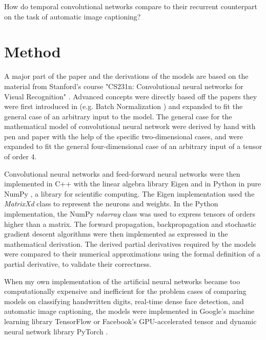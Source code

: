 \documentclass[a4paper, twoside]{article}
\begin{document}
How do temporal convolutional networks compare to their recurrent counterpart on the task of automatic image captioning?


\section{Method}
A major part of the paper and the derivations of the models are based on the material from Stanford's course "CS231n: Convolutional neural networks for Visual Recognition" \cite{cs231n}. Advanced concepts were directly based off the papers they were first introduced in (e.g. Batch Normalization \cite{batchnorm}) and expanded to fit the general case of an arbitrary input to the model. The general case for the mathematical model of convolutional neural network were derived by hand with pen and paper with the help of the specific two-dimensional cases, and were expanded to fit the general four-dimensional case of an arbitrary input of a tensor of order 4. 

Convolutional neural networks and feed-forward neural networks were then implemented in C++ with the linear algebra library Eigen \cite{eigen} and in Python in pure NumPy \cite{numpy}, a library for scientific computing. The Eigen implementation used the \textit{MatrixXd} class to represent the neurons and weights. In the Python implementation, the NumPy \textit{ndarray} class was used to express tensors of orders higher than a matrix. The forward propagation, backpropagation and stochastic gradient descent algorithms were then implemented as expressed in the mathematical derivation. The derived partial derivatives required by the models were compared to their numerical approximations using the formal definition of a partial derivative, to validate their correctness. 

When my own implementation of the artificial neural networks became too computationally expensive and inefficient for the problem cases of comparing models on classifying handwritten digits, real-time dense face detection, and automatic image captioning, the models were implemented in Google's machine learning library TensorFlow \cite{tensorflow} or Facebook's GPU-accelerated tensor and dynamic neural network library PyTorch \cite{pytorch}.
\end{document}
